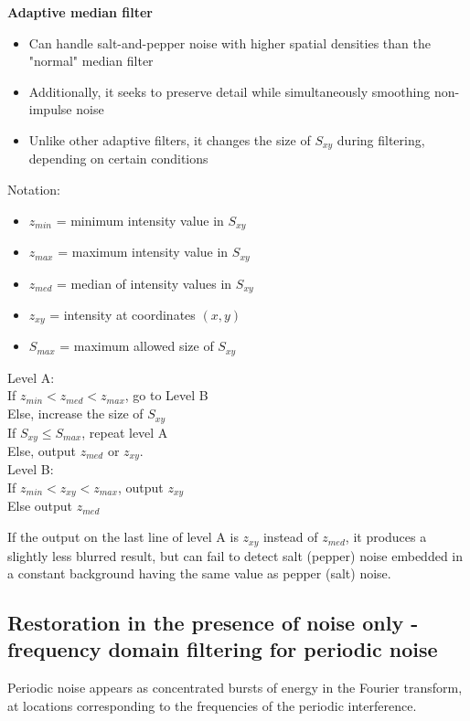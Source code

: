 \textbf{Adaptive median filter}
\begin{itemize}
	\item Can handle salt-and-pepper noise with higher spatial densities than the "normal" median filter
	\item Additionally, it seeks to preserve detail while simultaneously smoothing non-impulse noise
	\item Unlike other adaptive filters, it changes the size of $S_{xy}$ during filtering, depending on certain conditions
\end{itemize}
\begin{multicols}{2}
Notation:
\begin{itemize}
	\item $z_{min}$ = minimum intensity value in $S_{xy}$
	\item $z_{max}$ = maximum intensity value in $S_{xy}$
	\item $z_{med}$ = median of intensity values in $S_{xy}$
	\item $z_{xy}$ = intensity at coordinates $(x,y)$
	\item $S_{max}$ = maximum allowed size of $S_{xy}$
\end{itemize}
\vfill\null
\columnbreak
Level A:\\
If $z_{min} < z_{med} < z_{max}$, go to Level B\\
Else, increase the size of $S_{xy}$\\
If $S_{xy} \leq S_{max}$, repeat level A\\
Else, output $z_{med}$ or $z_{xy}$.\\

Level B:\\
If $z_{min} < z_{xy} < z_{max}$, output $z_{xy}$\\
Else output $z_{med}$\\
\end{multicols}
If the output on the last line of level A is $z_{xy}$ instead of $z_{med}$, it produces a slightly less blurred result, but can fail to detect salt (pepper) noise embedded in a constant background having the same value as pepper (salt) noise.

\subsection{Restoration in the presence of noise only - frequency domain filtering for periodic noise }
Periodic noise appears as concentrated bursts of energy in the Fourier transform, at locations corresponding to the frequencies of the periodic interference.

